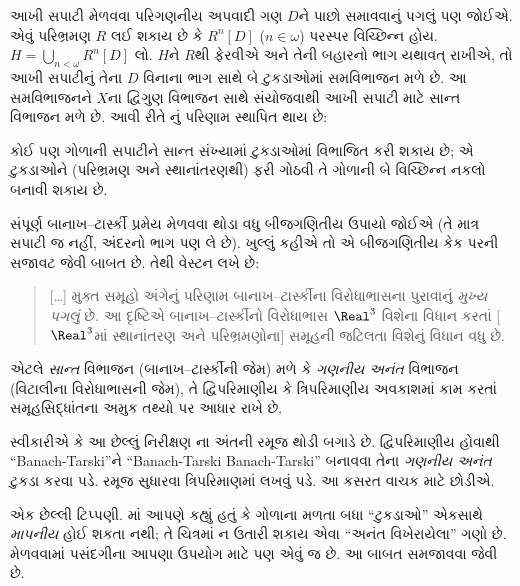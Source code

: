 આખી સપાટી મેળવવા પરિગણનીય અપવાદી ગણ $D$ને પાછો સમાવવાનું
પગલું પણ જોઈએ. એવું પરિભ્રમણ $R$ લઈ શકાય છે કે $R^n[D]$
($n\in\omega$) પરસ્પર વિચ્છિન્ન હોય. $H=\bigcup_{n<\omega}R^n[D]$
લો. $H$ને $R$થી ફેરવીએ અને તેની બહારનો ભાગ યથાવત્ રાખીએ,
તો આખી સપાટીનું તેના $D$ વિનાના ભાગ સાથે બે ટુકડાઓમાં
સમવિભાજન મળે છે. આ સમવિભાજનને $X$ના દ્વિગુણ વિભાજન સાથે
સંયોજવાથી આખી સપાટી માટે સાન્ત વિભાજન મળે છે. આવી રીતે
\citep{Hausdorff1914}નું પરિણામ સ્થાપિત થાય છે:

\begin{thm}
કોઈ પણ ગોળાની સપાટીને
સાન્ત સંખ્યામાં ટુકડાઓમાં
વિભાજિત કરી શકાય છે; એ
ટુકડાઓને (પરિભ્રમણ અને
સ્થાનાંતરણથી) ફરી ગોઠવી
તે ગોળાની બે વિચ્છિન્ન
નકલો બનાવી શકાય છે.
\end{thm}

સંપૂર્ણ બાનાખ--ટાર્સ્કી પ્રમેય
મેળવવા થોડા વધુ બીજગણિતીય
ઉપાયો જોઈએ (તે માત્ર સપાટી
જ નહીં, અંદરનો ભાગ પણ લે છે).
ખુલ્લું કહીએ તો એ બીજગણિતીય
કેક પરની સજાવટ જેવી બાબત છે.
તેથી વેસ્ટન લખે છે:
\begin{quote}
  [\ldots] મુક્ત સમૂહો અંગેનું
  પરિણામ બાનાખ--ટાર્સ્કીના
  વિરોધાભાસના પુરાવાનું
  \emph{મુખ્ય પગલું} છે. આ
  દૃષ્ટિએ બાનાખ--ટાર્સ્કીનો
  વિરોધાભાસ $\Real^3$ વિશેના
  વિધાન કરતાં [$\Real^3$માં
  સ્થાનાંતરણ અને પરિભ્રમણોના]
  સમૂહની જટિલતા વિશેનું
  વિધાન વધુ છે.
  \cite[p.~16]{Weston2003}
\end{quote}
એટલે \emph{સાન્ત} વિભાજન
(બાનાખ--ટાર્સ્કીની જેમ) મળે
કે \emph{ગણનીય અનંત} વિભાજન
(વિટાલીના વિરોધાભાસની જેમ),
તે દ્વિપરિમાણીય કે ત્રિપરિમાણીય
અવકાશમાં કામ કરતાં સમૂહસિદ્ધાંતના
અમુક તથ્યો પર આધાર રાખે છે.

સ્વીકારીએ કે આ છેલ્લું નિરીક્ષણ
ના અંતની
રમૂજ થોડી બગાડે છે. દ્વિપરિમાણીય
હોવાથી ``Banach-Tarski''ને
``Banach-Tarski Banach-Tarski''
બનાવવા તેના \emph{ગણનીય અનંત}
ટુકડા કરવા પડે. રમૂજ સુધારવા
ત્રિપરિમાણમાં લખવું પડે.
આ કસરત વાચક માટે છોડીએ.

એક છેલ્લી ટિપ્પણી.
માં આપણે કહ્યું
હતું કે ગોળાના મળતા બધા ``ટુકડાઓ''
એકસાથે \emph{માપનીય} હોઈ શકતા નથી;
તે ચિત્રમાં ન ઉતારી શકાય એવા
``અનંત વિખેરાયેલા'' ગણો છે.
મેળવવામાં પસંદગીના આપણા
ઉપયોગ માટે પણ એવું જ છે.
આ બાબત સમજાવવા જેવી છે.

